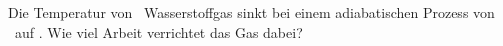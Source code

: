 Die Temperatur von \nWsO\ Wasserstoffgas sinkt bei einem adiabatischen Prozess von \TaO\ auf \TbO. Wie viel Arbeit verrichtet das Gas dabei?
